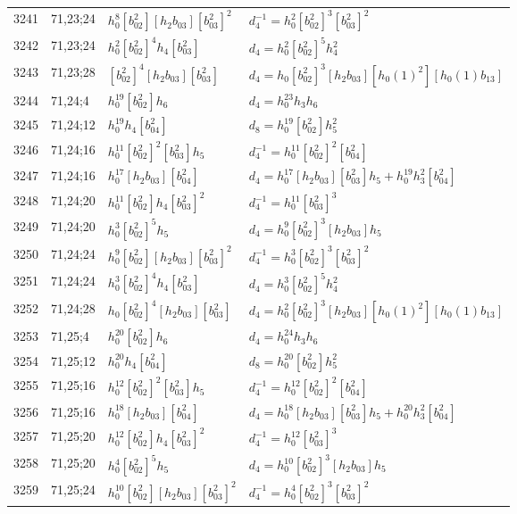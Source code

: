 \documentclass{article}
\begin{document}
\begin{longtable}{|l|l|>{\raggedright\arraybackslash}p{6cm}|>{\raggedright\arraybackslash}p{6cm}|}
\hline
3241 & 71,23;24 & $h_0^8[b_{02}^2][h_2b_{03}][b_{03}^2]^2$ & $d_{4}^{-1}=h_0^2[b_{02}^2]^3[b_{03}^2]^2$\\
3242 & 71,23;24 & $h_0^2[b_{02}^2]^4h_4[b_{03}^2]$ &$d_{4}=h_0^2[b_{02}^2]^5h_4^2$\\
\hline
3243 & 71,23;28 & $[b_{02}^2]^4[h_2b_{03}][b_{03}^2]$ &$d_{4}=h_0[b_{02}^2]^3[h_2b_{03}][h_0(1)^2][h_0(1)b_{13}]$\\
\hline
3244 & 71,24;4 & $h_0^{19}[b_{02}^2]h_6$ &$d_{4}=h_0^{23}h_3h_6$\\
\hline
3245 & 71,24;12 & $h_0^{19}h_4[b_{04}^2]$ &$d_{8}=h_0^{19}[b_{02}^2]h_5^2$\\
\hline
3246 & 71,24;16 & $h_0^{11}[b_{02}^2]^2[b_{03}^2]h_5$ & $d_{4}^{-1}=h_0^{11}[b_{02}^2]^2[b_{04}^2]$\\
3247 & 71,24;16 & $h_0^{17}[h_2b_{03}][b_{04}^2]$ &$d_{4}=h_0^{17}[h_2b_{03}][b_{03}^2]h_5 + h_0^{19}h_3^2[b_{04}^2]$\\
\hline
3248 & 71,24;20 & $h_0^{11}[b_{02}^2]h_4[b_{03}^2]^2$ & $d_{4}^{-1}=h_0^{11}[b_{03}^2]^3$\\
3249 & 71,24;20 & $h_0^3[b_{02}^2]^5h_5$ &$d_{4}=h_0^9[b_{02}^2]^3[h_2b_{03}]h_5$\\
\hline
3250 & 71,24;24 & $h_0^9[b_{02}^2][h_2b_{03}][b_{03}^2]^2$ & $d_{4}^{-1}=h_0^3[b_{02}^2]^3[b_{03}^2]^2$\\
3251 & 71,24;24 & $h_0^3[b_{02}^2]^4h_4[b_{03}^2]$ &$d_{4}=h_0^3[b_{02}^2]^5h_4^2$\\
\hline
3252 & 71,24;28 & $h_0[b_{02}^2]^4[h_2b_{03}][b_{03}^2]$ &$d_{4}=h_0^2[b_{02}^2]^3[h_2b_{03}][h_0(1)^2][h_0(1)b_{13}]$\\
\hline
3253 & 71,25;4 & $h_0^{20}[b_{02}^2]h_6$ &$d_{4}=h_0^{24}h_3h_6$\\
\hline
3254 & 71,25;12 & $h_0^{20}h_4[b_{04}^2]$ &$d_{8}=h_0^{20}[b_{02}^2]h_5^2$\\
\hline
3255 & 71,25;16 & $h_0^{12}[b_{02}^2]^2[b_{03}^2]h_5$ & $d_{4}^{-1}=h_0^{12}[b_{02}^2]^2[b_{04}^2]$\\
3256 & 71,25;16 & $h_0^{18}[h_2b_{03}][b_{04}^2]$ &$d_{4}=h_0^{18}[h_2b_{03}][b_{03}^2]h_5 + h_0^{20}h_3^2[b_{04}^2]$\\
\hline
3257 & 71,25;20 & $h_0^{12}[b_{02}^2]h_4[b_{03}^2]^2$ & $d_{4}^{-1}=h_0^{12}[b_{03}^2]^3$\\
3258 & 71,25;20 & $h_0^4[b_{02}^2]^5h_5$ &$d_{4}=h_0^{10}[b_{02}^2]^3[h_2b_{03}]h_5$\\
\hline
3259 & 71,25;24 & $h_0^{10}[b_{02}^2][h_2b_{03}][b_{03}^2]^2$ & $d_{4}^{-1}=h_0^4[b_{02}^2]^3[b_{03}^2]^2$\\

\end{longtable}
\end{document}
